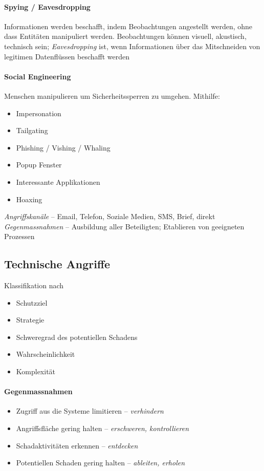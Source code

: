 \documentclass[a4paper,12pt]{article}
\begin{document}
\paragraph{Spying / Eavesdropping} Informationen werden beschafft, indem Beobachtungen angestellt werden, ohne dass Entitäten manipuliert werden. Beobachtungen können visuell, akustisch, technisch sein; \emph{Eavesdropping} ist, wenn Informationen über das Mitschneiden von legitimen Datenflüssen beschafft werden

\paragraph{Social Engineering} Menschen manipulieren um Sicherheitssperren zu umgehen. Mithilfe:
\begin{itemize}
\item Impersonation
\item Tailgating
\item Phishing / Vishing / Whaling
\item Popup Fenster
\item Interessante Applikationen
\item Hoaxing
\end{itemize}

\emph{Angriffskanäle} -- Email, Telefon, Soziale Medien, SMS, Brief, direkt
\emph{Gegenmassnahmen} -- Ausbildung aller Beteiligten; Etablieren von geeigneten Prozessen


\subsection{Technische Angriffe}
Klassifikation nach
\begin{itemize}
\item Schutzziel
\item Strategie
\item Schweregrad des potentiellen Schadens
\item Wahrscheinlichkeit
\item Komplexität
\end{itemize}

\paragraph{Gegenmassnahmen} 
\begin{itemize}
\item Zugriff aus die Systeme limitieren -- \emph{verhindern}
\item Angriffsfläche gering halten -- \emph{erschweren, kontrollieren}
\item Schadaktivitäten erkennen -- \emph{entdecken}
\item Potentiellen Schaden gering halten -- \emph{ableiten, erholen}
\end{itemize}
\end{document}
